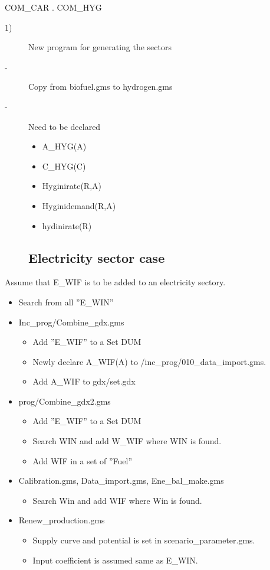 \documentclass[10pt,a4paper,titlepage,dvipdfmx]{book}
\begin{document}
COM\_CAR . COM\_HYG
\begin{description}
\item[1)]New program for generating the sectors
\item[-]Copy from biofuel.gms to hydrogen.gms
\item[-]Need to be declared
\begin{itemize}
\item \textcolor{color-3}{A\_HYG(A)}
\item \textcolor{color-3}{C\_HYG(C)}
\item Hyginirate(R,A)
\item Hyginidemand(R,A)
\item hydinirate(R)
\end{itemize}

\item[]

\subsection{\label{subsec:ElecSecCas}Electricity sector case}

\end{description}
Assume that E\_WIF is to be added to an electricity sectory.
\begin{itemize}
\item Search from all ''E\_WIN''
\item Inc\_prog/Combine\_gdx.gms
\begin{itemize}
\item Add ''E\_WIF'' to a Set DUM
\item Newly declare A\_WIF(A) to /inc\_prog/010\_data\_import.gms.
\item Add A\_WIF to gdx/set.gdx
\end{itemize}

\item prog/Combine\_gdx2.gms
\begin{itemize}
\item Add ''E\_WIF'' to a Set DUM
\item Search WIN  and add W\_WIF where WIN is found.
\item Add WIF in a set of ''Fuel''
\end{itemize}

\item Calibration.gms, Data\_import.gms, Ene\_bal\_make.gms
\begin{itemize}
\item Search Win and add WIF where Win is found.
\end{itemize}

\item Renew\_production.gms
\begin{itemize}
\item Supply curve and potential is set in scenario\_parameter.gms.
\item Input coefficient is assumed same as E\_WIN.
\end{itemize}

\end{itemize}
\end{document}
